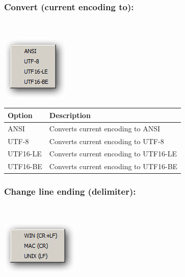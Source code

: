 \hypertarget{menu_encoding_convert}{}
\subsubsection{Convert (current encoding to):}\\

\includegraphics[scale=0.50]{./res/menu_encoding_convert.png}\\

\begin{scriptsize}\begin{tabularx}{\textwidth}{>{\hsize=0.3\hsize}X>{\hsize=0.7\hsize}X}\\
    \hline
    \textbf{Option} & \textbf{Description} \\
    \hline
    ANSI & Converts current encoding to ANSI \\
    UTF-8 & Converts current encoding to UTF-8 \\
    UTF16-LE & Converts current encoding to UTF16-LE \\
    UTF16-BE & Converts current encoding to UTF16-BE \\
    \hline
  \end{tabularx}\end{scriptsize}

\hypertarget{menu_encoding_delimiter}{}
\subsubsection{Change line ending (delimiter):}\\

\includegraphics[scale=0.50]{./res/menu_encoding_delimiter.png}\\

